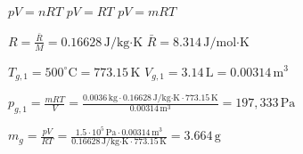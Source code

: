\( p V = n R T \)  
\( p V = R T \)  
\( p V = m R T \)  

\( R = \frac{\bar{R}}{M} = 0.16628 \, \text{J/kg·K} \)  
\( \bar{R} = 8.314 \, \text{J/mol·K} \)  

\( T_{g,1} = 500^\circ \text{C} = 773.15 \, \text{K} \)  
\( V_{g,1} = 3.14 \, \text{L} = 0.00314 \, \text{m}^3 \)  

\( p_{g,1} = \frac{m R T}{V} = \frac{0.0036 \, \text{kg} \cdot 0.16628 \, \text{J/kg·K} \cdot 773.15 \, \text{K}}{0.00314 \, \text{m}^3} = 197,333 \, \text{Pa} \)  

\( m_g = \frac{p V}{R T} = \frac{1.5 \cdot 10^5 \, \text{Pa} \cdot 0.00314 \, \text{m}^3}{0.16628 \, \text{J/kg·K} \cdot 773.15 \, \text{K}} = 3.664 \, \text{g} \)
